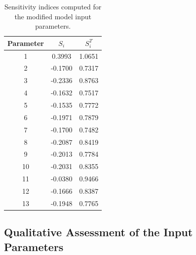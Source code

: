 \documentclass[11pt]{article}
\begin{document}
\begin{table}[!htbp]
	\centering
	\caption{Sensitivity indices computed for the modified model input parameters.}
	\vspace{0.5 cm}
		\begin{tabular}{c | c | c}
		Parameter & $S_i$ & $S_i^T$\\
		\hline
		1 & 0.3993 & 1.0651\\
		2 & -0.1700 & 0.7317\\
		3 & -0.2336 & 0.8763\\
		4 & -0.1632 & 0.7517\\
		5 & -0.1535 & 0.7772\\
		6 & -0.1971 & 0.7879\\
		7 & -0.1700 & 0.7482\\
		8 & -0.2087 & 0.8419\\
		9 & -0.2013 & 0.7784\\
		10 & -0.2031 & 0.8355\\
		11 & -0.0380 & 0.9466\\
		12 & -0.1666 & 0.8387\\
		13 & -0.1948 & 0.7765
	\end{tabular}
	\label{tab:si_modified}
\end{table}

\subsection{Qualitative Assessment of the Input Parameters}
\end{document}
